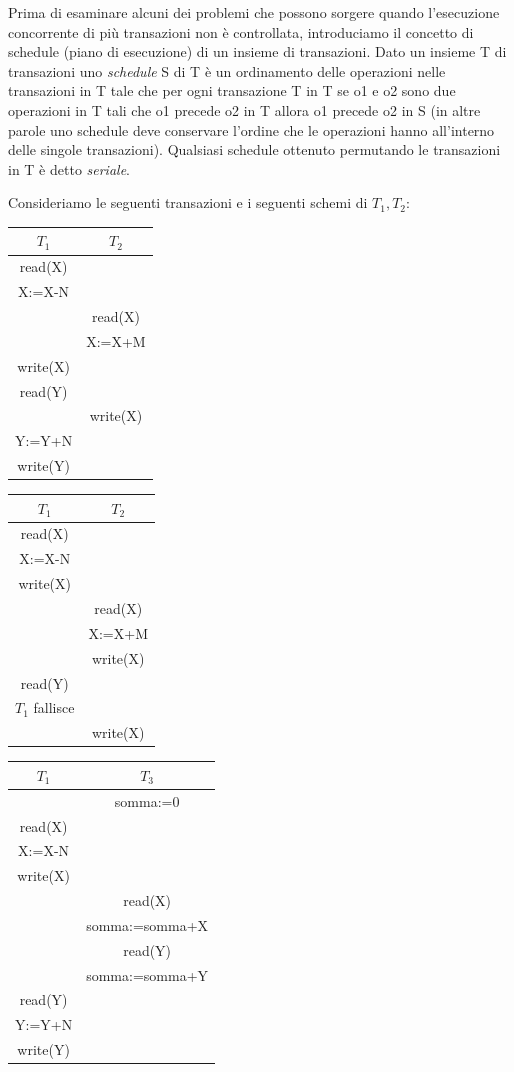 Prima di esaminare alcuni dei problemi che possono sorgere quando l'esecuzione concorrente di più transazioni non è controllata, introduciamo il concetto di schedule (piano di esecuzione) di un insieme di transazioni. Dato un insieme T di transazioni uno \textit{schedule} S di T è un ordinamento delle operazioni nelle transazioni in T tale che per ogni transazione T in T se o1 e o2 sono due operazioni in T tali che o1 precede o2 in T allora o1 precede o2 in S (in altre parole uno schedule deve conservare l'ordine che le operazioni hanno all'interno delle singole transazioni). Qualsiasi schedule ottenuto permutando le transazioni in T è detto \textit{seriale}.

Consideriamo le seguenti transazioni e i seguenti schemi di $T_1, T_2$:
\begin{center}
    \begin{tabular}{|c|c|}
         \hline$T_1$&$T_2$\\\hline
         read(X)& \\
         X:=X-N& \\
         &read(X) \\
         &X:=X+M \\
         write(X)& \\
         read(Y)& \\
         &write(X) \\
         Y:=Y+N& \\
         write(Y)& \\\hline
    \end{tabular}
    \begin{tabular}{|c|c|}
         \hline$T_1$&$T_2$\\\hline
         read(X)& \\
         X:=X-N& \\
         write(X)& \\
         &read(X) \\
         &X:=X+M \\
         &write(X) \\
         read(Y)& \\
         $T_1$ fallisce& \\
         &write(X) \\\hline
    \end{tabular}
    \begin{tabular}{|c|c|}
         \hline$T_1$&$T_3$\\\hline
         &somma:=0 \\
         read(X)& \\
         X:=X-N& \\
         write(X)& \\
         &read(X) \\
         &somma:=somma+X \\
         &read(Y) \\
         &somma:=somma+Y \\
         read(Y)& \\
         Y:=Y+N& \\
         write(Y)& \\\hline
    \end{tabular}
\end{center}


